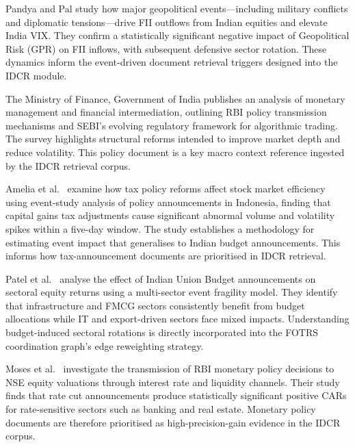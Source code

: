 \documentclass[12pt,a4paper,oneside]{report}
\theoremstyle{definition}
\theoremstyle{remark}
\begin{document}
\medskip

\noindent Pandya and Pal \cite{Pandya2025FIIGeopolitical} study how major geopolitical events---including military conflicts and diplomatic tensions---drive FII outflows from Indian equities and elevate India VIX. They confirm a statistically significant negative impact of Geopolitical Risk (GPR) on FII inflows, with subsequent defensive sector rotation. These dynamics inform the event-driven document retrieval triggers designed into the IDCR module.

\medskip

\noindent The Ministry of Finance, Government of India \cite{GovernmentOfIndia2025EconomicSurvey} publishes an analysis of monetary management and financial intermediation, outlining RBI policy transmission mechanisms and SEBI's evolving regulatory framework for algorithmic trading. The survey highlights structural reforms intended to improve market depth and reduce volatility. This policy document is a key macro context reference ingested by the IDCR retrieval corpus.

\medskip

\noindent Amelia et al.\ \cite{Amelia2025TaxReforms} examine how tax policy reforms affect stock market efficiency using event-study analysis of policy announcements in Indonesia, finding that capital gains tax adjustments cause significant abnormal volume and volatility spikes within a five-day window. The study establishes a methodology for estimating event impact that generalises to Indian budget announcements. This informs how tax-announcement documents are prioritised in IDCR retrieval.

\medskip

\noindent Patel et al.\ \cite{Patel2025UnionBudget} analyse the effect of Indian Union Budget announcements on sectoral equity returns using a multi-sector event fragility model. They identify that infrastructure and FMCG sectors consistently benefit from budget allocations while IT and export-driven sectors face mixed impacts. Understanding budget-induced sectoral rotations is directly incorporated into the FOTRS coordination graph's edge reweighting strategy.

\medskip

\noindent Moses et al.\ \cite{Moses2024RBIMonetary} investigate the transmission of RBI monetary policy decisions to NSE equity valuations through interest rate and liquidity channels. Their study finds that rate cut announcements produce statistically significant positive CARs for rate-sensitive sectors such as banking and real estate. Monetary policy documents are therefore prioritised as high-precision-gain evidence in the IDCR corpus.
\end{document}
